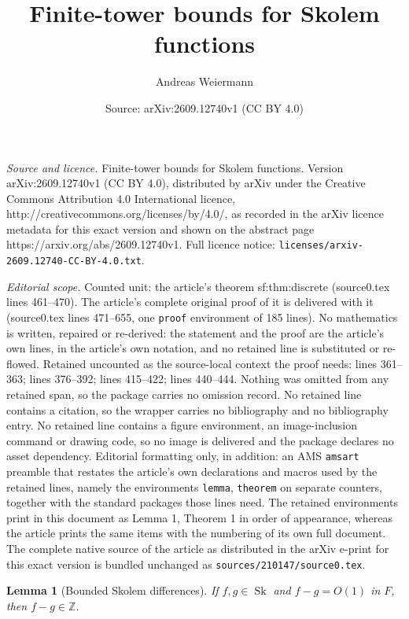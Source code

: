 \documentclass[10pt,a4paper]{amsart}
\title{Finite-tower bounds for Skolem functions}
\author{Andreas Weiermann}
\date{Source: arXiv:2609.12740v1 (CC BY 4.0)}
\newtheorem{lemma}{Lemma}
\newcommand{\Sk}{\operatorname{Sk}}
\newcommand{\Z}{\mathbb Z}
\begin{document}
\maketitle

\noindent\emph{Source and licence.} Finite-tower bounds for Skolem functions. Version arXiv:2609.12740v1 (CC BY 4.0), distributed by arXiv under the Creative Commons Attribution 4.0 International licence, http://creativecommons.org/licenses/by/4.0/, as recorded in the arXiv licence metadata for this exact version and shown on the abstract page https://arxiv.org/abs/2609.12740v1. Full licence notice: \texttt{licenses/arxiv-2609.12740-CC-BY-4.0.txt}.\par\smallskip

\noindent\textit{Editorial scope.} Counted unit: the article's theorem sf:thm:discrete (source0.tex lines 461--470). The article's complete original proof of it is delivered with it (source0.tex lines 471--655, one \texttt{proof} environment of 185 lines). No mathematics is written, repaired or re-derived: the statement and the proof are the article's own lines, in the article's own notation, and no retained line is substituted or re-flowed.  Retained uncounted as the source-local context the proof needs: lines 361--363; lines 376--392; lines 415--422; lines 440--444.  Nothing was omitted from any retained span, so the package carries no omission record.  No retained line contains a citation, so the wrapper carries no bibliography and no bibliography entry.  No retained line contains a figure environment, an image-inclusion command or drawing code, so no image is delivered and the package declares no asset dependency.  Editorial formatting only, in addition: an AMS \texttt{amsart} preamble that restates the article's own declarations and macros used by the retained lines, namely the environments \texttt{lemma}, \texttt{theorem} on separate counters, together with the standard packages those lines need.  The retained environments print in this document as Lemma 1, Theorem 1 in order of appearance, whereas the article prints the same items with the numbering of its own full document.  The complete native source of the article as distributed in the arXiv e-print for this exact version is bundled unchanged as \texttt{sources/210147/source0.tex}.
\begin{lemma}[Bounded Skolem differences]\label{sf:lem:integers}
If $f,g\in\Sk$ and $f-g=O(1)$ in $F$, then $f-g\in\Z$.
\end{lemma}
\end{document}

